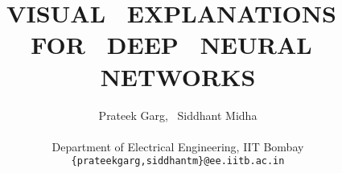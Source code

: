 \documentclass[10pt,twocolumn]{article}
\begin{document}
\title{VISUAL~ EXPLANATIONS~ FOR~ DEEP~ NEURAL~ NETWORKS}

\author{Prateek Garg,~ Siddhant Midha\\\vspace{-8pt}{\small~}\\
Department of Electrical Engineering, IIT Bombay \\
{\small{\tt{\{prateekgarg,siddhantm\}@ee.iitb.ac.in}}}
}

\maketitle
\thispagestyle{empty}


















\typeout{}
{\small


}
\end{document}
